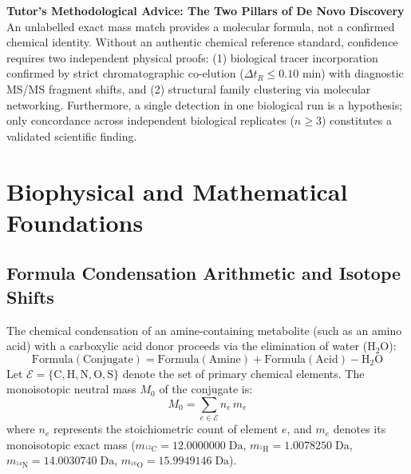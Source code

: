 \documentclass[11pt,twoside,openright]{book}
\begin{document}
\FloatBarrier

\begin{notebox}
\textbf{Tutor's Methodological Advice: The Two Pillars of De Novo Discovery}\\
An unlabelled exact mass match provides a molecular formula, not a confirmed chemical identity. Without an authentic chemical reference standard, confidence requires two independent physical proofs: (1) biological tracer incorporation confirmed by strict chromatographic co-elution ($\Delta t_R \le 0.10$ min) with diagnostic MS/MS fragment shifts, and (2) structural family clustering via molecular networking. Furthermore, a single detection in one biological run is a hypothesis; only concordance across independent biological replicates ($n \ge 3$) constitutes a validated scientific finding.
\end{notebox}

\section{Biophysical and Mathematical Foundations}

\subsection{Formula Condensation Arithmetic and Isotope Shifts}

The chemical condensation of an amine-containing metabolite (such as an amino acid) with a carboxylic acid donor proceeds via the elimination of water ($\text{H}_2\text{O}$):
\begin{equation}
\text{Formula}(\text{Conjugate}) = \text{Formula}(\text{Amine}) + \text{Formula}(\text{Acid}) - \text{H}_2\text{O}
\label{eq:condensation}
\end{equation}
Let $\mathcal{E} = \{\text{C}, \text{H}, \text{N}, \text{O}, \text{S}\}$ denote the set of primary chemical elements. The monoisotopic neutral mass $M_0$ of the conjugate is:
\begin{equation}
M_0 = \sum_{e \in \mathcal{E}} n_e \, m_e
\label{eq:neutral_mass}
\end{equation}
where $n_e$ represents the stoichiometric count of element $e$, and $m_e$ denotes its monoisotopic exact mass ($m_{^{12}\text{C}} = 12.0000000\;\text{Da}$, $m_{^{1}\text{H}} = 1.0078250\;\text{Da}$, $m_{^{14}\text{N}} = 14.0030740\;\text{Da}$, $m_{^{16}\text{O}} = 15.9949146\;\text{Da}$).
\end{document}
